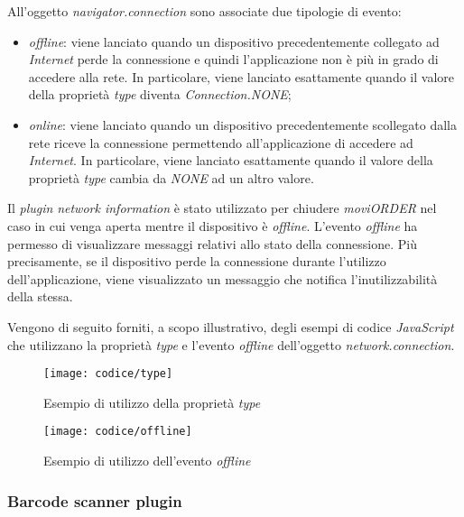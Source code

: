 All'oggetto \textit{navigator.connection} sono associate due tipologie di evento:
\begin{itemize}
	\item \textit{offline}: viene lanciato quando un dispositivo precedentemente collegato ad \textit{Internet} perde la connessione e quindi l'applicazione non è più in grado di accedere alla rete. In particolare, viene lanciato esattamente quando il valore della proprietà \textit{type} diventa \textit{Connection.NONE};
	\item \textit{online}: viene lanciato quando un dispositivo precedentemente scollegato dalla rete riceve la connessione permettendo all'applicazione di accedere ad \textit{Internet}. In particolare, viene lanciato esattamente quando il valore della proprietà \textit{type} cambia da \textit{NONE} ad un altro valore.
\end{itemize}
Il \textit{plugin} \textit{network information} è stato utilizzato per chiudere \textit{moviORDER} nel caso in cui venga aperta mentre il dispositivo è \textit{offline}. L'evento \textit{offline} ha permesso di visualizzare messaggi relativi allo stato della connessione. Più precisamente, se il dispositivo perde la connessione durante l'utilizzo dell'applicazione, viene visualizzato un messaggio che notifica l'inutilizzabilità della stessa.

Vengono di seguito forniti, a scopo illustrativo, degli esempi di codice \textit{JavaScript} che utilizzano la proprietà \textit{type} e l'evento \textit{offline} dell'oggetto \textit{network.connection}.

\begin{figure}[!h] 
    \centering 
    \texttt{[image: codice/type]} 
    \caption{Esempio di utilizzo della proprietà \textit{type}}
\end{figure}

\begin{figure}[!h] 
    \centering 
    \texttt{[image: codice/offline]} 
    \caption{Esempio di utilizzo dell'evento \textit{offline}}
\end{figure}

\subsubsection{Barcode scanner plugin}

